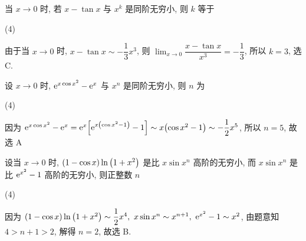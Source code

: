 \begin{example}[2019 数一]
    当 $x\to0$ 时, 若 $x-\tan x$ 与 $x^{k}$ 是同阶无穷小, 则 $k$ 等于 
    \begin{tasks}(4)
    \end{tasks}
\end{example}
\begin{solution}
    由于当 $x\to0$ 时, $x-\tan x\sim-\dfrac{1}{3}x^3$, 则 $\displaystyle\lim_{x\to0}\dfrac{x-\tan x}{x^3}=-\dfrac{1}{3}$, 所以 $k=3$, 选 C.
\end{solution}

\begin{example}
    设 $x\to0$ 时, $\mathrm{e} ^{x\cos x^2}-\mathrm{e} ^{x}$ 与 $x^n$ 是同阶无穷小, 则 $n $ 为
    \begin{tasks}(4)
    \end{tasks}
\end{example}
\begin{solution}
    因为 $\mathrm{e} ^{x\cos x^2}-\mathrm{e} ^{x}=\mathrm{e}^x\qty[\mathrm{e} ^{x\qty(\cos x^2-1)}-1]\sim x\qty(\cos x^2-1)\sim -\dfrac{1}{2}x^5$, 所以 $n=5$, 故选 A
\end{solution}

\begin{example}[2001 数二]
    设当 $x\to0 $ 时, $(1-\cos x)\ln\qty(1+x^2)$ 是比 $x\sin x^n$ 高阶的无穷小, 而 $x\sin x^n$ 是比 $\mathrm{e} ^{x^2}-1$ 高阶的无穷小, 则正整数 $n$ 
    \begin{tasks}(4)
    \end{tasks}
\end{example}
\begin{solution}
    因为 $(1-\cos x)\ln\qty(1+x^2)\sim\dfrac{1}{2}x^4,~x\sin x^n\sim x^{n+1},~\mathrm{e} ^{x^2}-1\sim x^2$, 由题意知 $4>n+1>2$, 解得 $n=2$, 故选 B.
\end{solution}